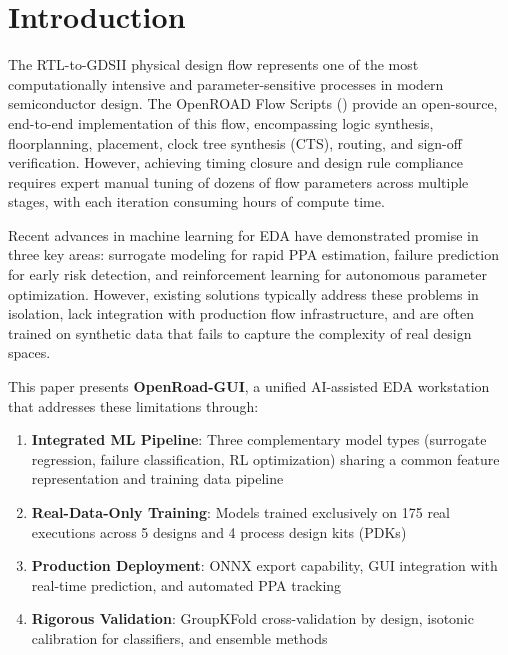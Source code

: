 \documentclass[10pt,conference]{IEEEtran}
\newcommand{\ORFS}{\text{ORFS}}
\begin{document}

\section{Introduction}
\label{sec:introduction}

The RTL-to-GDSII physical design flow represents one of the most computationally intensive and parameter-sensitive processes in modern semiconductor design. The OpenROAD Flow Scripts (\ORFS{}) provide an open-source, end-to-end implementation of this flow, encompassing logic synthesis, floorplanning, placement, clock tree synthesis (CTS), routing, and sign-off verification. However, achieving timing closure and design rule compliance requires expert manual tuning of dozens of flow parameters across multiple stages, with each iteration consuming hours of compute time.

Recent advances in machine learning for EDA have demonstrated promise in three key areas: surrogate modeling for rapid PPA estimation, failure prediction for early risk detection, and reinforcement learning for autonomous parameter optimization. However, existing solutions typically address these problems in isolation, lack integration with production flow infrastructure, and are often trained on synthetic data that fails to capture the complexity of real design spaces.

This paper presents \textbf{OpenRoad-GUI}, a unified AI-assisted EDA workstation that addresses these limitations through:

\begin{enumerate}
    \item \textbf{Integrated ML Pipeline}: Three complementary model types (surrogate regression, failure classification, RL optimization) sharing a common feature representation and training data pipeline
    \item \textbf{Real-Data-Only Training}: Models trained exclusively on 175 real \ORFS{} executions across 5 designs and 4 process design kits (PDKs)
    \item \textbf{Production Deployment}: ONNX export capability, GUI integration with real-time prediction, and automated PPA tracking
    \item \textbf{Rigorous Validation}: GroupKFold cross-validation by design, isotonic calibration for classifiers, and ensemble methods
\end{enumerate}
\end{document}
